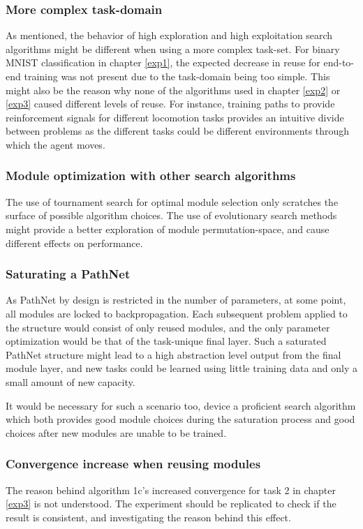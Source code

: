 \subsubsection{More complex task-domain}
As mentioned, the behavior of high exploration and high exploitation search algorithms might be different when using a more complex task-set. For binary MNIST classification in chapter \ref{exp1}, the expected decrease in reuse for end-to-end training was not present due to the task-domain being too simple. This might also be the reason why none of the algorithms used in chapter \ref{exp2} or \ref{exp3} caused different levels of reuse. For instance, training paths to provide reinforcement signals for different locomotion tasks provides an intuitive divide between problems as the different tasks could be different environments through which the agent moves.   

\subsubsection{Module optimization with other search algorithms}
The use of tournament search for optimal module selection only scratches the surface of possible algorithm choices. The use of evolutionary search methods might provide a better exploration of module permutation-space, and cause different effects on performance. 

\subsubsection{Saturating a PathNet}
As PathNet by design is restricted in the number of parameters, at some point, all modules are locked to backpropagation. Each subsequent problem applied to the structure would consist of only reused modules, and the only parameter optimization would be that of the task-unique final layer. Such a saturated PathNet structure might lead to a high abstraction level output from the final module layer, and new tasks could be learned using little training data and only a small amount of new capacity. 

It would be necessary for such a scenario too, device a proficient search algorithm which both provides good module choices during the saturation process and good choices after new modules are unable to be trained. 

\subsubsection{Convergence increase when reusing modules}
The reason behind algorithm 1c's increased convergence for task 2 in chapter \ref{exp3} is not understood. The experiment should be replicated to check if the result is consistent, and investigating the reason behind this effect. 



